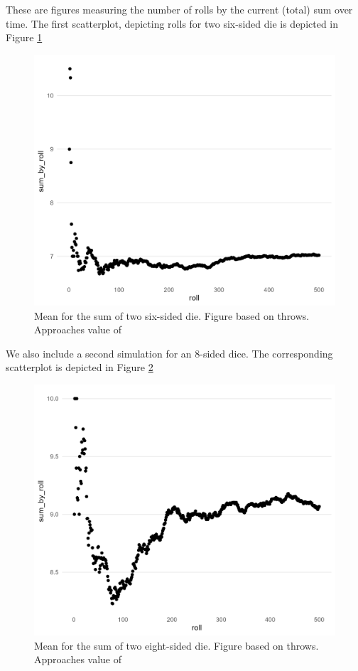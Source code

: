 \documentclass[12pt]{article}
\theoremstyle{definition}
\begin{document}
\newpage

These are figures measuring the number of rolls by the current (total) sum over time. The first scatterplot, depicting rolls for two six-sided die is depicted in Figure \ref{fig:scatter_baseline} 
\begin{figure}[tbh!]
\centering
\includegraphics[width=.8\linewidth]{plot/baseline/lln_plot_baseline.png}
\caption[]{Mean for the sum of two six-sided die. Figure based on throws. Approaches value of }
\label{fig:scatter_baseline}
\end{figure}

\newpage

We also include a second simulation for an 8-sided dice. The corresponding scatterplot is depicted in Figure 
\ref{fig:scatter_8side} 
\begin{figure}[tbh!]
\centering
\includegraphics[width=.8\linewidth]{plot/500_8/lln_plot_500_8.png}
\caption[]{Mean for the sum of two eight-sided die. Figure based on throws. Approaches value of }
\label{fig:scatter_8side}
\end{figure}
\end{document}
